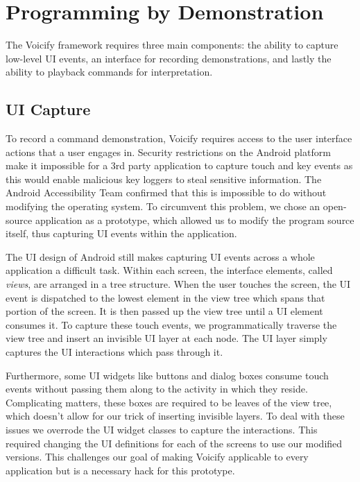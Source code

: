 \documentclass[letterpaper]{article}
\begin{document}


\section{Programming by Demonstration}
The Voicify framework requires three main components: the ability to capture low-level UI events, 
an interface for recording demonstrations, and lastly the ability to playback commands for interpretation.

\subsection{UI Capture}
To record a command demonstration, Voicify requires access to the user interface actions that a user engages in.
Security restrictions on the Android platform make it impossible for a 3rd party application to capture 
touch and key events as this would enable malicious key loggers to steal sensitive information. 
The Android Accessibility Team \cite{androidaccessibility} confirmed that this is impossible to do without modifying the operating system.
To circumvent this problem, we chose an open-source application as a prototype, which allowed us to modify
the program source itself, thus capturing UI events within the application.

The UI design of Android still makes capturing UI events across a whole application a difficult task.
Within each screen, the interface elements, called \emph{views}, are arranged in a tree structure. When the user
touches the screen, the UI event is dispatched to the lowest element in the view tree which spans that portion of the 
screen. It is then passed up the view tree until a UI element consumes it. To capture these touch events,
we programmatically traverse the view tree and insert an invisible UI layer at each node. The UI layer
simply captures the UI interactions which pass through it.

Furthermore, some UI widgets like buttons and dialog boxes consume touch events without passing them along
to the activity in which they reside. Complicating matters, these boxes are required to be leaves
of the view tree, which doesn't allow for our trick of inserting invisible layers. To deal with these issues
we overrode the UI widget classes to capture the interactions. This required changing the UI definitions for
each of the screens to use our modified versions. This challenges our goal of making Voicify applicable to
every application but is a necessary hack for this prototype.
\end{document}
